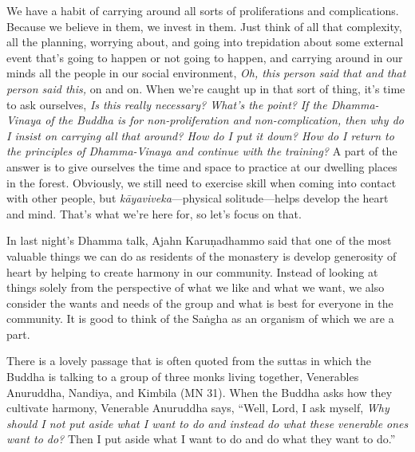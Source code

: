 We have a habit of carrying around all sorts of proliferations and 
complications. Because we believe in them, we invest in them. Just 
think of all that complexity, all the planning, worrying about, and 
going into trepidation about some external event that's going to happen 
or not going to happen, and carrying around in our minds all the people 
in our social environment, \emph{Oh, this person said that and that 
person said this,} on and on. When we're caught up in that sort of 
thing, it's time to ask ourselves, \emph{Is this really necessary? 
What's the point?} \emph{If the Dhamma-Vinaya of the Buddha is for 
non-proliferation and non-complication, then why do I insist on 
carrying all that around? How do I put it down? How do I return to the 
principles of Dhamma-Vinaya and continue with the training?} A part of 
the answer is to give ourselves the time and space to practice at our 
dwelling places in the forest. Obviously, we still need to exercise 
skill when coming into contact with other people, but 
\emph{kāyaviveka}---physical solitude---helps develop the heart and 
mind. That's what we're here for, so let's focus on that.


In last night's Dhamma talk, Ajahn Karuṇadhammo said that one of the 
most valuable things we can do as residents of the monastery is develop 
generosity of heart by helping to create harmony in our community. 
Instead of looking at things solely from the perspective of what we 
like and what we want, we also consider the wants and needs of the 
group and what is best for everyone in the community. It is good to 
think of the Saṅgha as an organism of which we are a part.

There is a lovely passage that is often quoted from the suttas in which 
the Buddha is talking to a group of three monks living together, 
Venerables Anuruddha, Nandiya, and Kimbila (MN 31). When the Buddha 
asks how they cultivate harmony, Venerable Anuruddha says, ``Well, 
Lord, I ask myself, \emph{Why should I not put aside what I want to do 
and instead do what these venerable ones want to do?} Then I put aside 
what I want to do and do what they want to do.''


